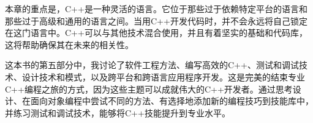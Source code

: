 本章的重点是，C++是一种灵活的语言。它位于那些过于依赖特定平台的语言和那些过于高级和通用的语言之间。当用C++开发代码时，并不会永远将自己锁定在这门语言中。C++可以与其他技术混合使用，并且有着坚实的基础和代码库，这将帮助确保其在未来的相关性。

这本书的第五部分中，我讨论了软件工程方法、编写高效的C++、测试和调试技术、设计技术和模式，以及跨平台和跨语言应用程序开发。这是完美的结束专业C++编程之旅的方式，因为这些主题可以成就伟大的C++开发者。通过思考设计、在面向对象编程中尝试不同的方法、有选择地添加新的编程技巧到技能库中，并练习测试和调试技术，能够将C++技能提升到专业水平。

